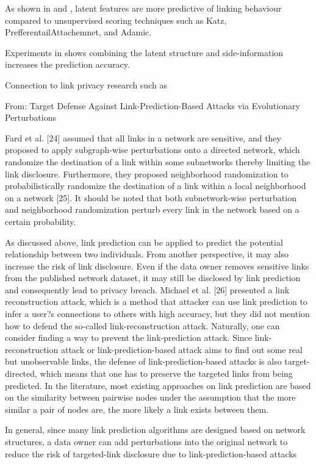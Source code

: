 As shown in \cite{menon2011link} and \cite{Zhu2016}, latent features are more predictive of linking behaviour compared to unsupervised scoring techniques such as Katz, PrefferentailAttachemnet, and Adamic.

Experiments in \cite{menon2011link} shows combining the latent structure and side-information increases the prediction accuracy.


Connection to link privacy research such as \cite{amin:wwwj}

From: Target Defense Against Link-Prediction-Based Attacks via Evolutionary Perturbations

Fard et al. [24] assumed that all links in a network are sensitive, and they proposed to apply subgraph-wise perturbations onto a directed network, which randomize the destination of a link within some subnetworks thereby limiting the link disclosure. Furthermore, they proposed neighborhood randomization to probabilistically randomize the destination of a link within a local neighborhood on a network [25]. It should be noted that both subnetwork-wise perturbation and neighborhood randomization perturb every link in the network based on a certain probability.

As discussed above, link prediction can be applied to predict the potential relationship between two individuals. From another perspective, it may also increase the risk of link disclosure. Even if the data owner removes sensitive links from the published network dataset, it may still be disclosed by link prediction and consequently lead to privacy breach. Michael et al. [26] presented a link reconstruction attack, which is a method that attacker can use link prediction to infer a user?s connections to others with high accuracy, but they did not mention how to defend the so-called link-reconstruction attack. Naturally, one can consider finding a way to prevent the link-prediction attack. Since link-reconstruction attack or link-prediction-based attack aims to find out some real but unobservable links, the defense of link-prediction-based attacks is also target-directed, which means that one has to preserve the targeted links from being predicted. In the literature, most existing approaches on link prediction are based on the similarity between pairwise nodes under the assumption that the more similar a pair of nodes are, the more likely a link exists between them.

In general, since many link prediction algorithms are designed based on network structures, a data owner can add perturbations into the original
network to reduce the risk of targeted-link disclosure due to link-prediction-based attacks


